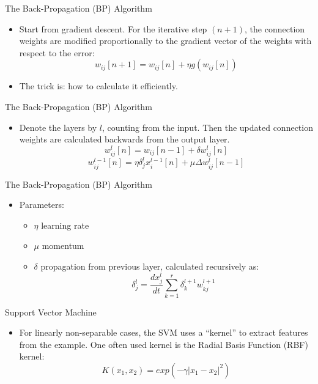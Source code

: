 \documentclass[bigger]{beamer}
\begin{document}
\begin{frame}[fragile]{The Back-Propagation (BP) Algorithm}
\begin{itemize}
\item Start from gradient descent. For the iterative step $(n+1)$, the connection weights are modified proportionally to the gradient vector of the weights with respect to the error:
\[w_{ij}[n+1] = w_{ij}[n] + \eta g(w_{ij}[n])\]
\item The trick is: how to calculate it efficiently.
\end{itemize}
\end{frame}

\begin{frame}[fragile]{The Back-Propagation (BP) Algorithm}
\begin{itemize}
\item Denote the layers by $l$, counting from the input. 
Then the updated connection weights are calculated backwards from the output layer.
\[w_{ij}^l[n] = w_{ij}[n-1] + \delta w_{ij}^l[n]\]
\[w_{ij}^{l-1}[n] = \eta \delta_j^l x_i^{l-1}[n] + \mu \Delta w_{ij}^l [n-1]\]
\end{itemize}
\end{frame}

\begin{frame}[fragile]{The Back-Propagation (BP) Algorithm}
\begin{itemize}
\item Parameters:
\begin{itemize}
\item{$\eta$}  learning rate
\item{$\mu$}   momentum
\item{$\delta$}  propagation from previous layer, calculated recursively as:
\[\delta_j^l = \frac{dx_j^l}{dt} \sum_{k=1}^r{\delta_k^{l+1} w_{kj}^{l+1}}\]
\end{itemize}
\end{itemize}
\end{frame}


\begin{frame}[fragile]{Support Vector Machine}
\begin{itemize}
\item For linearly non-separable cases, the SVM uses a “kernel” to extract features from the example. One often used kernel is the Radial Basis Function (RBF) kernel:
\[K(x_1,x_2) = exp(-\gamma |x_1 - x_2|^2)\]
\end{itemize}
\end{frame}
\end{document}
